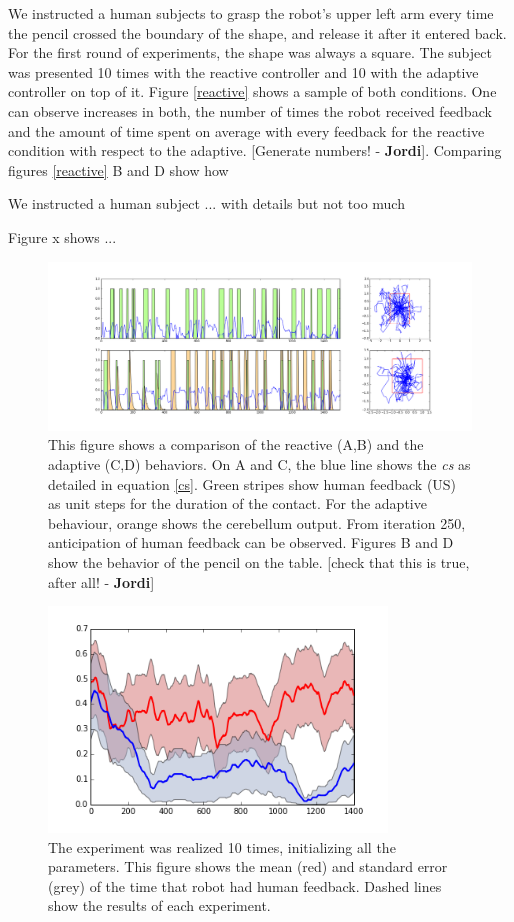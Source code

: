 \documentclass[letterpaper, 10 pt, conference]{ieeeconf}  %
\newcommand\jp[1]{{\color{red}}{\color{red}}{\footnotesize \color{red}[#1 - \textbf{Jordi}]}} %
\begin{document}
{We instructed a human subjects to grasp the robot's upper left arm every time the pencil crossed the boundary of the shape, and release it after it entered back. For the first round of experiments, the shape was always a square. The subject was presented 10 times with the reactive controller and 10 with the adaptive controller on top of it. 
Figure \ref{reactive} shows a sample of both conditions. One can observe increases in both, the number of times the robot received feedback and the amount of time spent on average with every feedback for the reactive condition with respect to the adaptive. \jp{Generate numbers!}. Comparing figures \ref{reactive} B and D show how

We instructed a human subject ...
with details but not too much

Figure x shows ...


\begin{figure}[bc]
\centering
\includegraphics[width=20cm]{reactive_adaptive}
\caption{This figure shows a comparison of the reactive (A,B) and the adaptive (C,D) behaviors. On A and C, the blue line shows the \emph{cs} as detailed in equation \ref{cs}. Green stripes show human feedback (US) as unit steps for the duration of the contact. For the adaptive behaviour, orange shows the cerebellum output. From iteration 250, anticipation of human feedback can be observed. Figures B and D show the behavior of the pencil on the table. \jp{check that this is true, after all!}}
\label{fig:reactive}
\end{figure}




\begin{figure}
\centering
\includegraphics[width=9cm]{error}
\caption{The experiment was realized 10 times, initializing all the parameters. This figure shows the mean (red) and standard error (grey) of the time that robot had human feedback. Dashed lines show the results of each experiment. }
\label{fig:error}
\end{figure}

}
\end{document}
